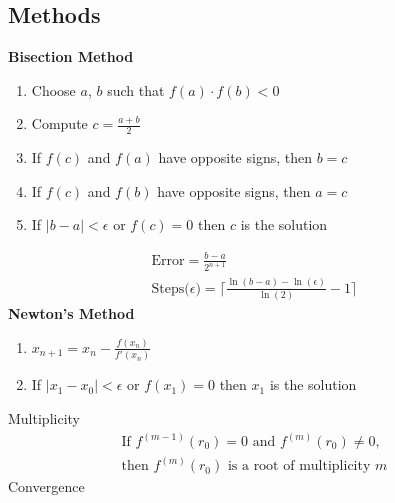 \documentclass[10pt]{article}
\begin{document}
\begin{multicols}{2}
\begin{minipage}{\columnwidth}
\begin{flushright}
            \subsection*{Methods}
            \textbf{Bisection Method}
            \begin{enumerate}
                \item Choose \(a\), \(b\) such that \(f(a) \cdot f(b) < 0\)
                \item Compute \(c = \frac{a+b}{2}\)
                \item If \(f(c)\) and \(f(a)\) have opposite signs, then \(b = c\)
                \item If \(f(c)\) and \(f(b)\) have opposite signs, then \(a = c\)
                \item If \(|b - a| < \epsilon\) or \(f(c) = 0\) then \(c\) is the solution
            \end{enumerate}    
            \begin{equation*}
                \begin{aligned}
                    \text{Error} = \frac{b - a}{2^{n + 1}} & \\ 
                    \text{Steps(\(\epsilon\))} = \bigl\lceil \frac{\ln(b-a) - \ln(\epsilon)}{\ln(2)}-1 \bigr\rceil &
                \end{aligned}
            \end{equation*}
            \textbf{Newton's Method}
            \begin{enumerate}
                \item \(x_{n+1} = x_n - \frac{f(x_n)}{f'(x_n)}\)
                \item If \(|x_1 - x_0| < \epsilon\) or \(f(x_1) = 0\) then \(x_1\) is the solution
            \end{enumerate}
            Multiplicity
            \begin{equation*}
                \begin{aligned}
                    \text{If } f^{(m-1)}(r_0) = 0 \text{ and } f^{(m)}(r_0) \neq 0 \text{,} & \\
                    \text{then } f^{(m)}(r_0) \text{ is a root of multiplicity } m &
                \end{aligned}
            \end{equation*}
            Convergence
            \vspace*{-1em}
            \setlength{\columnsep}{-1in}
            \begin{multicols}{2}     

\end{multicols}
\end{flushright}
\end{minipage}
\end{multicols}
\end{document}
